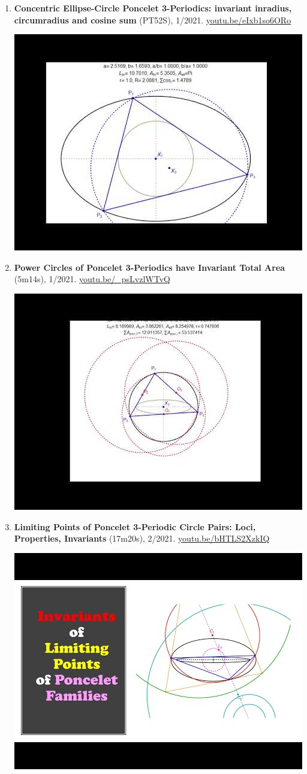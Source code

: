 \documentclass[12pt]{article}
\begin{document}
\begin{enumerate}[resume]
% 
\item \textbf{Concentric Ellipse-Circle Poncelet 3-Periodics: invariant inradius, circumradius and cosine sum} (PT52S), 1/2021. \href{https://youtu.be/eIxb1so6ORo}{\url{youtu.be/eIxb1so6ORo}}
\begin{center}\includegraphics[width=.5\textwidth]{pics/eIxb1so6ORo.jpg}\end{center}
% 
\item \textbf{Power Circles of Poncelet 3-Periodics have Invariant Total Area} (5m14s), 1/2021. \href{https://youtu.be/_psLvzlWTvQ}{\url{youtu.be/\_psLvzlWTvQ}}
\begin{center}\includegraphics[width=.5\textwidth]{pics/_psLvzlWTvQ.jpg}\end{center}
% 
\item \textbf{Limiting Points of Poncelet 3-Periodic Circle Pairs: Loci, Properties, Invariants} (17m20s), 2/2021. \href{https://youtu.be/bHTLS2XzkIQ}{\url{youtu.be/bHTLS2XzkIQ}}
\begin{center}\includegraphics[width=.5\textwidth]{pics/bHTLS2XzkIQ.jpg}\end{center}

\end{enumerate}
\end{document}
